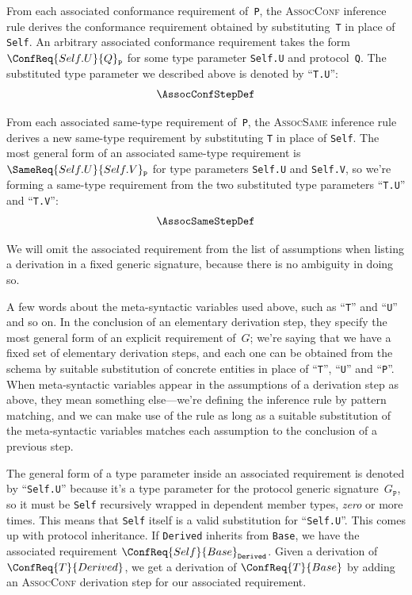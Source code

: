\documentclass[../generics]{subfiles}
\begin{document}
From each associated conformance requirement of~\texttt{P}, the \textsc{AssocConf} inference rule derives the conformance requirement obtained by substituting~\texttt{T} in place of \texttt{Self}. An arbitrary associated conformance requirement takes the form $\ConfReq{Self.U}{Q}_\texttt{P}$ for some type parameter \texttt{Self.U} and protocol~\texttt{Q}. The substituted type parameter we described above is denoted by ``\texttt{T.U}'':
\begin{gather*}
\AssocConfStepDef
\end{gather*}

From each associated same-type requirement of~\texttt{P}, the \textsc{AssocSame} inference rule derives a new same-type requirement by substituting \texttt{T} in place of \texttt{Self}. The most general form of an associated same-type requirement is $\SameReq{Self.U}{Self.V}_\texttt{P}$ for type parameters \texttt{Self.U} and \texttt{Self.V}, so we're forming a same-type requirement from the two substituted type parameters ``\texttt{T.U}'' and ``\texttt{T.V}'':
\begin{gather*}
\AssocSameStepDef
\end{gather*}

We will omit the associated requirement from the list of assumptions when listing a derivation in a fixed generic signature, because there is no ambiguity in doing so.

A few words about the meta-syntactic variables used above, such as ``\texttt{T}'' and ``\texttt{U}'' and so on. In the conclusion of an elementary derivation step, they specify the most general form of an explicit requirement of~$G$; we're saying that we have a fixed set of elementary derivation steps, and each one can be obtained from the schema by suitable substitution of concrete entities in place of ``\texttt{T}'', ``\texttt{U}'' and ``\texttt{P}''. When meta-syntactic variables appear in the assumptions of a derivation step as above, they mean something else---we're defining the inference rule by pattern matching, and we can make use of the rule as long as a suitable substitution of the meta-syntactic variables matches each assumption to the conclusion of a previous step.

The general form of a type parameter inside an associated requirement is denoted by ``\texttt{Self.U}'' because it's a type parameter for the protocol generic signature~$G_\texttt{P}$, so it must be \texttt{Self} recursively wrapped in dependent member types, \emph{zero} or more times. This means that \texttt{Self} itself is a valid substitution for ``\texttt{Self.U}''. This comes up with protocol inheritance. If \texttt{Derived} inherits from \texttt{Base}, we have the associated requirement $\ConfReq{Self}{Base}_\texttt{Derived}$. Given a derivation of $\ConfReq{T}{Derived}$, we get a derivation of $\ConfReq{T}{Base}$ by adding an \textsc{AssocConf} derivation step for our associated requirement.
\end{document}
